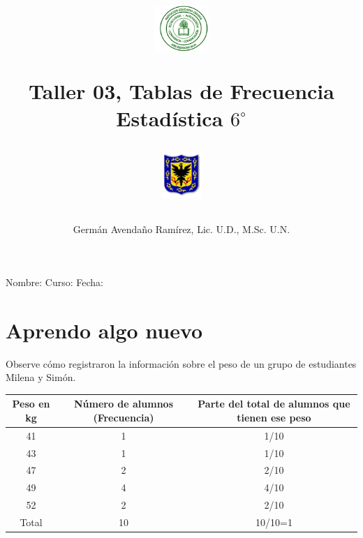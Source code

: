 \documentclass[10pt,twoside]{article}
\author{Germ\'an Avenda\~no Ram\'irez, Lic. U.D., M.Sc. U.N.}
\title{\begin{minipage}{.2\textwidth}
\includegraphics[height=1.75cm]{Images/logo-colegio.png}\end{minipage}
\begin{minipage}{.55\textwidth}
\begin{center}
Taller 03, Tablas de Frecuencia  \\
Estadística $6^{\circ}$
\end{center}
\end{minipage}\hfill
\begin{minipage}{.2\textwidth}
\includegraphics[height=1.75cm]{Images/logo-sed.png} 
\end{minipage}}
\date{}
\begin{document}
\maketitle
Nombre: \hrulefill Curso: \underline{\hspace*{44pt}} Fecha: \underline{\hspace*{2.5cm}}
\section*{Aprendo algo nuevo}
Observe cómo registraron la información sobre el peso de un grupo de estudiantes Milena y Simón.
\begin{tabular}{|c|c|c|}
\hline 
Peso en kg & Número de alumnos (Frecuencia) & Parte del total de alumnos que tienen ese peso \\ 
\hline 
41 & 1 & 1/10 \\ 
\hline 
43 & 1 & 1/10 \\ 
\hline 
47 & 2 & 2/10 \\ 
\hline 
49 & 4 & 4/10 \\ 
\hline 
52 & 2 & 2/10 \\ 
\hline 
Total & 10 & 10/10=1 \\ 
\hline 
\end{tabular} 
\end{document}
